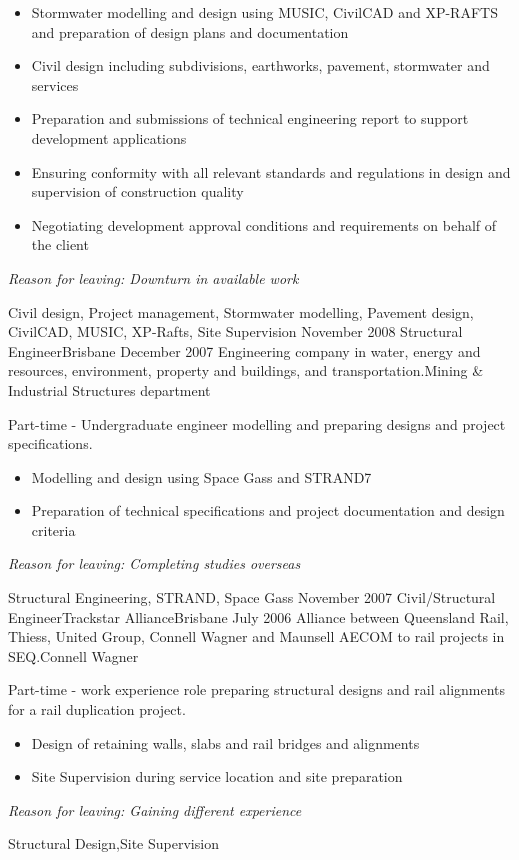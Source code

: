 \begin{experiences}
{\begin{itemize}
		\item Stormwater modelling and design using MUSIC, CivilCAD and XP-RAFTS and preparation of design plans and documentation
		\item Civil design including subdivisions, earthworks, pavement, stormwater and services
		\item Preparation and submissions of technical engineering report to support development applications
		\item Ensuring conformity with all relevant standards and regulations in design and supervision of construction quality   
		\item Negotiating development approval conditions and requirements on behalf of the client
               \end{itemize}
                    \textit{Reason for leaving: Downturn in available work}
                    }
                    {Civil design, Project management, Stormwater modelling, Pavement design, CivilCAD, MUSIC, XP-Rafts, Site Supervision}
  \emptySeparator
  \consultantexperience
  {November 2008}      {Structural Engineer}{}{Brisbane}
  {December 2007}      {Engineering company in water, energy and resources, environment, property and buildings, and transportation.}{Mining \& Industrial Structures department}
   { Part-time - Undergraduate engineer modelling and preparing designs and project specifications.
                    
        \begin{itemize}
		\item Modelling and design using Space Gass and STRAND7
		\item Preparation of technical specifications and project documentation and design criteria
               \end{itemize}
                    \textit{Reason for leaving: Completing studies overseas}
                    }
                    {Structural Engineering, STRAND, Space Gass} 
  \emptySeparator   
  \consultantexperience
  {November 2007}    {Civil/Structural Engineer}{Trackstar Alliance}{Brisbane}
  {July 2006}       {Alliance between Queensland Rail, Thiess, United Group, Connell Wagner and Maunsell AECOM to rail projects in SEQ.}{Connell Wagner}
  		{Part-time - work experience role preparing structural designs and rail alignments for a rail duplication project.                 
                      \begin{itemize}
		\item Design of retaining walls, slabs and rail bridges and alignments
		\item Site Supervision during service location and site preparation
                      \end{itemize}
                    \textit{Reason for leaving: Gaining different experience}
                    }
                    {Structural Design,Site Supervision}   
  \emptySeparator            
\end{experiences}
